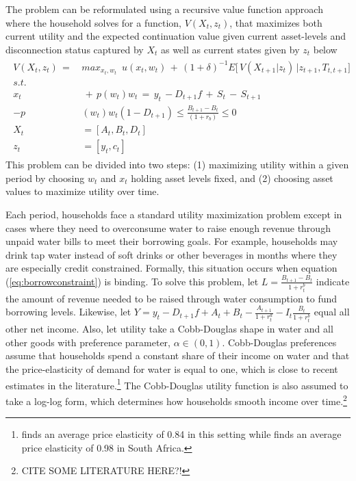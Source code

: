 \documentclass[12pt]{article}
\begin{document}
The problem can be reformulated using a recursive value function approach where the household solves for a function, $V(X_t,z_t)$, that maximizes both current utility and the expected continuation value given current asset-levels and disconnection status captured by $X_t$ as well as current states given by $z_t$ below
\begin{align}\label{eq:valmax}
\begin{split}
V(X_t,z_t) \,=\, &max_{x_t,w_t}  \,\,\, u(x_t,w_t) \,+\, (1+\delta)^{-1} E \Big[\, V(X_{t+1}|z_{t})\,\Big| z_{t+1}, T_{t,t+1} \Big]
\\
s.t.& \\
x_t & \, + \, p(w_t) w_t \, = \, y_t \, - D_{t+1} f  \, + \, S_t \, - \, S_{t+1} \\
-p&(w_t) w_t (1-D_{t+1}) \leq \frac{B_{t+1}-B_t}{(1+r_b)} \leq 0  \\
X_t &= [A_{t},B_{t},D_{t}] \\
z_t &= [y_t,c_t]
\end{split} 
\end{align}
This problem can be divided into two steps: (1) maximizing utility within a given period by choosing $w_t$ and $x_t$ holding asset levels fixed, and (2) choosing asset values to maximize utility over time.

Each period, households face a standard utility maximization problem except in cases where they need to overconsume water to raise enough revenue through unpaid water bills to meet their borrowing goals.  For example, households may drink tap water instead of soft drinks or other beverages in months where they are especially credit constrained.  Formally, this situation occurs when equation (\ref{eq:borrowconstraint}) is binding.  To solve this problem, let $L = \frac{B_{t+1} - B_t }{1+r^{b}_{t}}$ indicate the amount of revenue needed to be raised through water consumption to fund borrowing levels.  Likewise, let $Y = y_t  - D_{t+1} f   +  A_t + B_t  -  \frac{A_{t+1}}{1+r^{a}_{t}} - I_t \frac{B_t}{1+r^{b}_{t}}$ equal all other net income.  Also, let utility take a Cobb-Douglas shape in water and all other goods with preference parameter, $\alpha \in (0,1)$.  Cobb-Douglas preferences assume that households spend a constant share of their income on water and that the price-elasticity of demand for water is equal to one, which is close to recent estimates in the literature.\footnote{\cite{wjv} finds an average price elasticity of 0.84 in this setting while \cite{szabo2015value} finds an average price elasticity of 0.98 in South Africa.}  The Cobb-Douglas utility function is also assumed to take a log-log form, which determines how households smooth income over time.\footnote{CITE SOME LITERATURE HERE?!}
\end{document}
